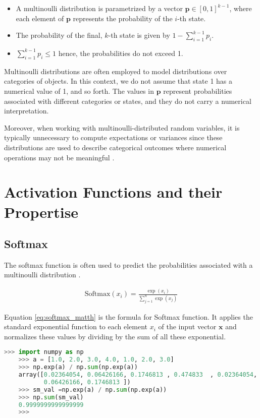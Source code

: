 \begin{itemize}
    \item A multinoulli distribution is parametrized by a vector $\mathbf{p} \in [0, 1]^{k-1}$, where each element of $\mathbf{p}$ represents the probability of the $i$-th state. 
    \item  The probability of the final, $k$-th state is given by $1 - \sum_{i=1}^{k-1} p_i$. 
    \item  $\sum_{i=1}^{k-1} p_i \leq 1$ hence, the probabilities do not exceed 1. 
\end{itemize}



Multinoulli distributions are often employed to model distributions over categories of objects. In this context, we do not assume that state 1 has a numerical value of 1, and so forth. The values in $\mathbf{p}$ represent probabilities associated with different categories or states, and they do not carry a numerical interpretation.

Moreover, when working with multinoulli-distributed random variables, it is typically unnecessary to compute expectations or variances since these distributions are used to describe categorical outcomes where numerical operations may not be meaningful \parencite[Page 60,61]{Goodfellow-et-al-2016}. 

\section{Activation Functions and their Propertise}
\subsection{Softmax}

The softmax function is often used to predict the probabilities associated with a multinoulli distribution \parencite[Page 79]{Goodfellow-et-al-2016}.

\begin{align}
    \text{Softmax}(x_i) = \frac{{\exp(x_i)}}{{\sum_{j=1}^n \exp(x_j)}} \label{eq:softmax_matth}
\end{align}

Equation \ref{eq:softmax_matth} is the formula for Softmax function. It applies the standard exponential function to each element $ x_i $ of the input vector $ \mathbf{x} $  and normalizes these values by dividing by the sum of all these exponential. 

\begin{lstlisting}[language=Python,caption={Python example for softmax},label=code:sample_softmax]
    >>> import numpy as np
    >>> a = [1.0, 2.0, 3.0, 4.0, 1.0, 2.0, 3.0]
    >>> np.exp(a) / np.sum(np.exp(a))
    array([0.02364054, 0.06426166, 0.1746813 , 0.474833  , 0.02364054,
           0.06426166, 0.1746813 ])
    >>> sm_val =np.exp(a) / np.sum(np.exp(a))
    >>> np.sum(sm_val)
    0.9999999999999999
    >>>
\end{lstlisting}


